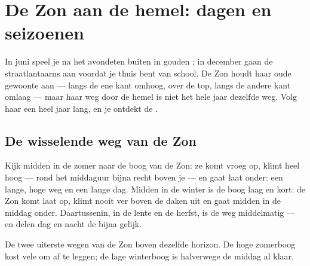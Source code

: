 \chapter{De Zon aan de hemel: dagen en seizoenen}\label{ch:g3:sun-days-seasons}

In juni speel je na het avondeten buiten in gouden ; in december
gaan de straatlantaarns aan voordat je thuis bent van school. De Zon
houdt haar oude gewoonte aan --- langs de ene kant omhoog, over de
top, langs de andere kant omlaag --- maar haar weg door de hemel is
niet het hele jaar dezelfde weg. Volg haar een heel jaar lang, en je
ontdekt de .

\section{De wisselende weg van de Zon}

\begin{example}\label{ex:g3:sun-days-seasons:roads}
Kijk midden in de zomer naar de boog van de Zon: ze komt vroeg op,
klimt heel hoog --- rond het middaguur bijna recht boven je --- en
gaat laat onder: een lange, hoge weg en een lange dag. Midden in de
winter is de boog laag en kort: de Zon komt laat op, klimt nooit ver
boven de daken uit en gaat midden in de middag onder. Daartussenin, in
de lente en de herfst, is de weg middelmatig --- en delen dag en nacht
de  bijna gelijk.
\end{example}

\begin{omfigure}

{\small De twee uiterste wegen van de Zon boven dezelfde horizon. De
hoge zomerboog kost vele  om af te leggen; de lage winterboog is
halverwege de middag al klaar.}
\end{omfigure}

